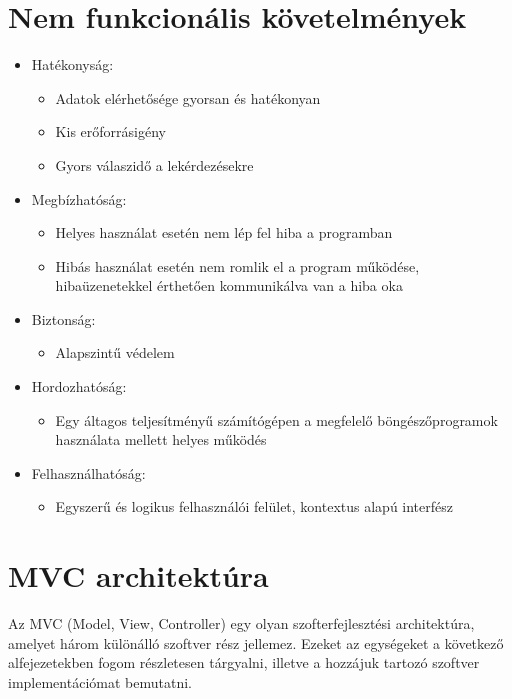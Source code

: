 \section{Nem funkcionális követelmények}

\begin{itemize}
	\item Hatékonyság: 
	\begin{itemize}
		\item Adatok elérhetősége gyorsan és hatékonyan
		\item Kis erőforrásigény
		\item Gyors válaszidő a lekérdezésekre
	\end{itemize}
	\item Megbízhatóság:
	\begin{itemize}
		\item Helyes használat esetén nem lép fel hiba a programban
		\item Hibás használat esetén nem romlik el a program működése, hibaüzenetekkel érthetően kommunikálva van a hiba oka
	\end{itemize}
	\item Biztonság:
	\begin{itemize}
		\item Alapszintű védelem
	\end{itemize}	
	\item Hordozhatóság:
	\begin{itemize}
		\item Egy áltagos teljesítményű számítógépen a megfelelő böngészőprogramok használata mellett helyes működés
	\end{itemize}
	\item Felhasználhatóság:
	\begin{itemize}
		\item Egyszerű és logikus felhasználói felület, kontextus alapú interfész
	\end{itemize}
\end{itemize}

\pagebreak

\section{MVC architektúra}

\label{ch:mvc}

Az MVC (Model, View, Controller) egy olyan szofterfejlesztési architektúra, amelyet három különálló szoftver rész jellemez. Ezeket az egységeket a következő alfejezetekben fogom részletesen tárgyalni, illetve a hozzájuk tartozó szoftver implementációmat bemutatni.

